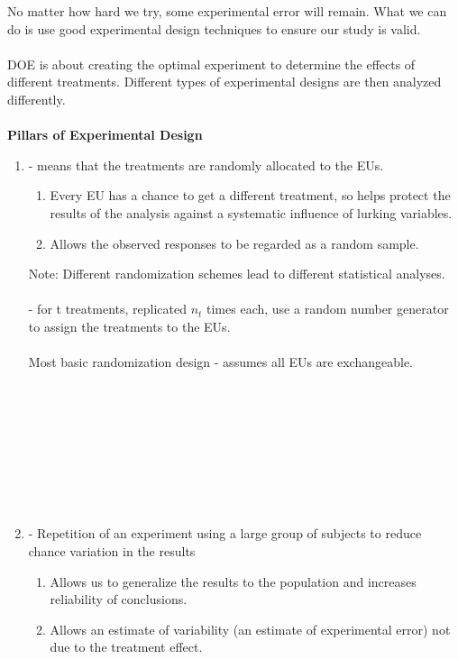 No matter how hard we try, some experimental error will remain. What we can do is use good experimental design techniques to ensure our study is valid.\\~\\
DOE is about creating the optimal experiment to determine the effects of different treatments.  Different types of experimental designs are then analyzed differently.\\~\\
\textbf{Pillars of Experimental Design}\\
\begin{enumerate}
		\item \underbar{~~~~~~~~~~~~~~~~~~~~~~~~~~~~~} - means that the treatments are randomly allocated to the EUs.
			\begin{enumerate}
				\item Every EU has a chance to get a different treatment, so helps protect the results of the analysis against a systematic influence of lurking variables.  
				\item Allows the observed responses to be regarded as a random sample.
			\end{enumerate}
		Note: Different randomization schemes lead to different statistical analyses.\\~\\
		\underbar{~~~~~~~~~~~~~~~~~~~~~~~~~~~~~~~~~~~~~~~~~~~~~~~~} - for t treatments, replicated $n_t$ times each, use a random number generator to assign the treatments to the EUs.\\~\\
		Most basic randomization design - assumes all EUs are exchangeable.\\~\\~\\~\\~\\~\\~\\~\\~\\
		\item \underbar{~~~~~~~~~~~~~~~~~~~~~~~~~~~~~} - Repetition of an experiment using a large group of subjects to reduce chance variation in the results
\begin{enumerate}
				\item Allows us to generalize the results to the population and increases reliability of conclusions. 
				\item Allows an estimate of variability (an estimate of experimental error) not due to the treatment effect.

\end{enumerate}
\end{enumerate}
